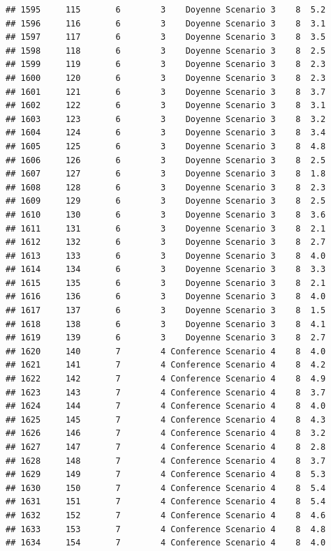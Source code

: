 \documentclass[
]{article}
\begin{document}
\begin{verbatim}
## 1595     115       6        3    Doyenne Scenario 3    8  5.2
## 1596     116       6        3    Doyenne Scenario 3    8  3.1
## 1597     117       6        3    Doyenne Scenario 3    8  3.5
## 1598     118       6        3    Doyenne Scenario 3    8  2.5
## 1599     119       6        3    Doyenne Scenario 3    8  2.3
## 1600     120       6        3    Doyenne Scenario 3    8  2.3
## 1601     121       6        3    Doyenne Scenario 3    8  3.7
## 1602     122       6        3    Doyenne Scenario 3    8  3.1
## 1603     123       6        3    Doyenne Scenario 3    8  3.2
## 1604     124       6        3    Doyenne Scenario 3    8  3.4
## 1605     125       6        3    Doyenne Scenario 3    8  4.8
## 1606     126       6        3    Doyenne Scenario 3    8  2.5
## 1607     127       6        3    Doyenne Scenario 3    8  1.8
## 1608     128       6        3    Doyenne Scenario 3    8  2.3
## 1609     129       6        3    Doyenne Scenario 3    8  2.5
## 1610     130       6        3    Doyenne Scenario 3    8  3.6
## 1611     131       6        3    Doyenne Scenario 3    8  2.1
## 1612     132       6        3    Doyenne Scenario 3    8  2.7
## 1613     133       6        3    Doyenne Scenario 3    8  4.0
## 1614     134       6        3    Doyenne Scenario 3    8  3.3
## 1615     135       6        3    Doyenne Scenario 3    8  2.1
## 1616     136       6        3    Doyenne Scenario 3    8  4.0
## 1617     137       6        3    Doyenne Scenario 3    8  1.5
## 1618     138       6        3    Doyenne Scenario 3    8  4.1
## 1619     139       6        3    Doyenne Scenario 3    8  2.7
## 1620     140       7        4 Conference Scenario 4    8  4.0
## 1621     141       7        4 Conference Scenario 4    8  4.2
## 1622     142       7        4 Conference Scenario 4    8  4.9
## 1623     143       7        4 Conference Scenario 4    8  3.7
## 1624     144       7        4 Conference Scenario 4    8  4.0
## 1625     145       7        4 Conference Scenario 4    8  4.3
## 1626     146       7        4 Conference Scenario 4    8  3.2
## 1627     147       7        4 Conference Scenario 4    8  2.8
## 1628     148       7        4 Conference Scenario 4    8  3.7
## 1629     149       7        4 Conference Scenario 4    8  5.3
## 1630     150       7        4 Conference Scenario 4    8  5.4
## 1631     151       7        4 Conference Scenario 4    8  5.4
## 1632     152       7        4 Conference Scenario 4    8  4.6
## 1633     153       7        4 Conference Scenario 4    8  4.8
## 1634     154       7        4 Conference Scenario 4    8  4.0

\end{verbatim}
\end{document}
